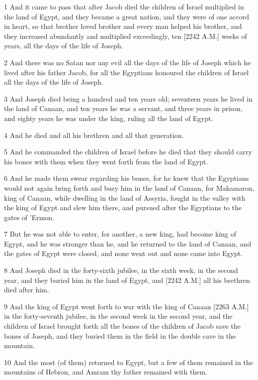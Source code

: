 \par 1 And it came to pass that after Jacob died the children of Israel multiplied in the land of Egypt, and they became a great nation, and they were of one accord in heart, so that brother loved brother and every man helped his brother, and they increased abundantly and multiplied exceedingly, ten [2242 A.M.] weeks of years, all the days of the life of Joseph.
\par 2 And there was no Satan nor any evil all the days of the life of Joseph which he lived after his father Jacob, for all the Egyptians honoured the children of Israel all the days of the life of Joseph.
\par 3 And Joseph died being a hundred and ten years old; seventeen years he lived in the land of Canaan, and ten years he was a servant, and three years in prison, and eighty years he was under the king, ruling all the land of Egypt.
\par 4 And he died and all his brethren and all that generation.
\par 5 And he commanded the children of Israel before he died that they should carry his bones with them when they went forth from the land of Egypt.
\par 6 And he made them swear regarding his bones, for he knew that the Egyptians would not again bring forth and bury him in the land of Canaan, for Makamaron, king of Canaan, while dwelling in the land of Assyria, fought in the valley with the king of Egypt and slew him there, and pursued after the Egyptians to the gates of 'Ermon.
\par 7 But he was not able to enter, for another, a new king, had become king of Egypt, and he was stronger than he, and he returned to the land of Canaan, and the gates of Egypt were closed, and none went out and none came into Egypt.
\par 8 And Joseph died in the forty-sixth jubilee, in the sixth week, in the second year, and they buried him in the land of Egypt, and [2242 A.M.] all his brethren died after him.
\par 9 And the king of Egypt went forth to war with the king of Canaan [2263 A.M.] in the forty-seventh jubilee, in the second week in the second year, and the children of Israel brought forth all the bones of the children of Jacob save the bones of Joseph, and they buried them in the field in the double cave in the mountain.
\par 10 And the most (of them) returned to Egypt, but a few of them remained in the mountains of Hebron, and Amram thy father remained with them.
